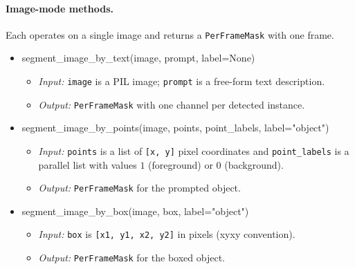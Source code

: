 \documentclass{llmxive}
\providecommand{\apicode}[1]{#1}
\begin{document}
\paragraph{Image-mode methods.} Each operates on a single image and returns a \texttt{PerFrameMask} with one frame.
\begin{itemize}[leftmargin=1.5em]
\item \apicode{segment_image_by_text(image, prompt, label=None)}
  \begin{itemize}
  \item \emph{Input:} \texttt{image} is a PIL image; \texttt{prompt} is a free-form text description.
  \item \emph{Output:} \texttt{PerFrameMask} with one channel per detected instance.
  \end{itemize}
\item \apicode{segment_image_by_points(image, points, point_labels, label="object")}
  \begin{itemize}
  \item \emph{Input:} \texttt{points} is a list of \texttt{[x, y]} pixel coordinates and \texttt{point\_labels} is a parallel list with values $1$ (foreground) or $0$ (background).
  \item \emph{Output:} \texttt{PerFrameMask} for the prompted object.
  \end{itemize}
\item \apicode{segment_image_by_box(image, box, label="object")}
  \begin{itemize}
  \item \emph{Input:} \texttt{box} is \texttt{[x1, y1, x2, y2]} in pixels (xyxy convention).
  \item \emph{Output:} \texttt{PerFrameMask} for the boxed object.
  \end{itemize}
\end{itemize}
\end{document}
